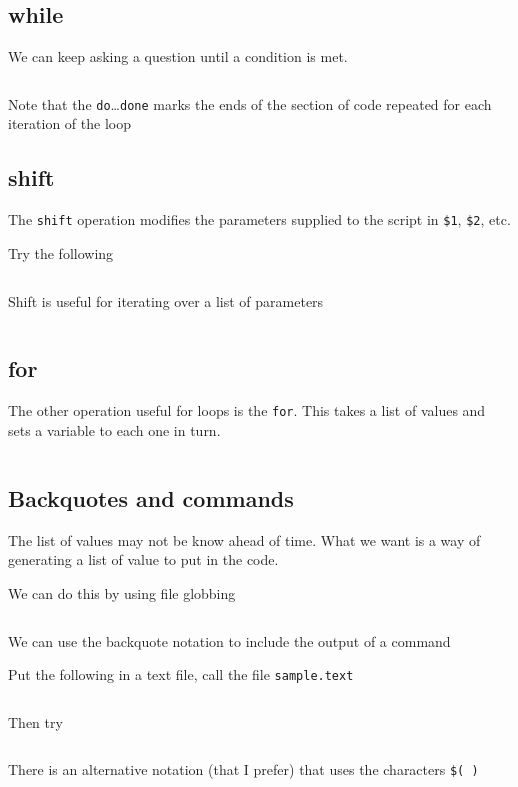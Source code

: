 \documentclass{article}
\begin{document}
\subsection{while}
We can keep asking a question until a condition is met.
\inputminted[frame=leftline,rulecolor=\color{Green},framerule=3pt]{bash}{scripts/liferepr}
Note that the \texttt{do}\ldots\texttt{done} marks the ends of the
section of code repeated for each iteration of the loop

\subsection{shift}
The \texttt{shift} operation modifies the parameters supplied to the
script in \texttt{\$1}, \texttt{\$2}, etc.

Try the following
\inputminted[frame=leftline,rulecolor=\color{Green},framerule=3pt]{bash}{scripts/shiftex}
Shift is useful for iterating over a list of parameters
\inputminted[frame=leftline,rulecolor=\color{Green},framerule=3pt]{bash}{scripts/shiftsum}

\subsection{for}
The other operation useful for loops is the \texttt{for}.
This takes a list of values and sets a variable to each one in turn.
\inputminted[frame=leftline,rulecolor=\color{Green},framerule=3pt]{bash}{scripts/forabc}

\subsection{Backquotes and commands}
The list of values may not be know ahead of time.  What we want is a
way of generating a list of value to put in the code.

We can do this by using file globbing
\inputminted[frame=leftline,rulecolor=\color{Green},framerule=3pt]{bash}{scripts/forglob}

We can use the backquote notation to include the output of a command

Put the following in a text file, call the file \texttt{sample.text}
\inputminted[frame=leftline,rulecolor=\color{Green},framerule=3pt]{text}{scripts/sample.text}



Then try
\inputminted[frame=leftline,rulecolor=\color{Green},framerule=3pt]{bash}{scripts/fortext}

There is an alternative notation (that I prefer) that uses the
characters \texttt{\$( )}
\inputminted[frame=leftline,rulecolor=\color{Green},framerule=3pt]{bash}{scripts/fortextalt}
\end{document}
